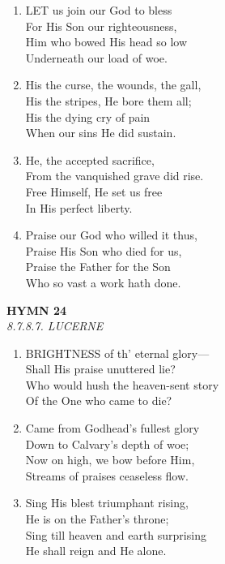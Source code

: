 \documentclass[11pt,a4paper]{article}
\begin{document}
\begin{enumerate}
    \item LET us join our God to bless \\
        For His Son our righteousness, \\
        Him who bowed His head so low \\
        Underneath our load of woe.

    \item His the curse, the wounds, the gall, \\
        His the stripes, He bore them all; \\
        His the dying cry of pain \\
        When our sins He did sustain.

    \item He, the accepted sacrifice, \\
        From the vanquished grave did rise. \\
        Free Himself, He set us free \\
        In His perfect liberty.

    \item Praise our God who willed it thus, \\
        Praise His Son who died for us, \\
        Praise the Father for the Son \\
        Who so vast a work hath done.

\end{enumerate}

\newpage
\begin{center}
    {\Large \textbf{HYMN 24}}
    \\
    \textit{8.7.8.7. LUCERNE}
\end{center}
\vspace{1em}

\begin{enumerate}
    \item BRIGHTNESS of th' eternal glory--- \\
        Shall His praise unuttered lie? \\
        Who would hush the heaven-sent story \\
        Of the One who came to die?

    \item Came from Godhead's fullest glory \\
        Down to Calvary's depth of woe; \\
        Now on high, we bow before Him, \\
        Streams of praises ceaseless flow.

    \item Sing His blest triumphant rising, \\
        He is on the Father's throne; \\
        Sing till heaven and earth surprising \\
        He shall reign and He alone.

\end{enumerate}
\end{document}
